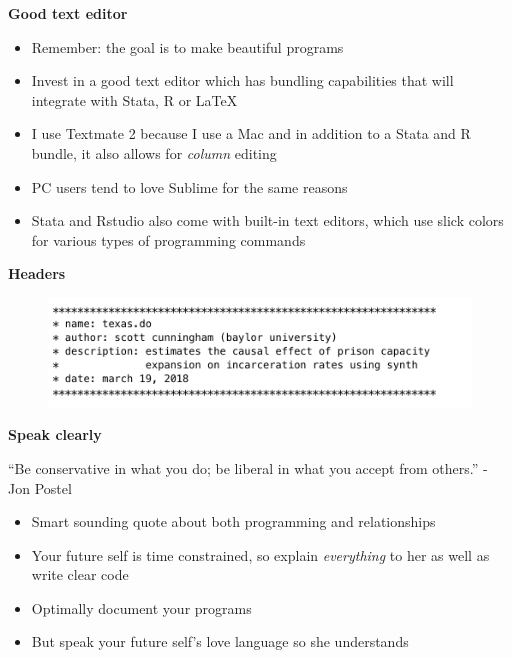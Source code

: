 \documentclass[notes=show]{beamer}
\begin{document}
\begin{frame}[plain]
\begin{center}
\textbf{Good text editor}
\end{center}

\begin{itemize}
\item Remember: the goal is to make beautiful programs
\item Invest in a good text editor which has bundling capabilities that will integrate with Stata, R or LaTeX
\item I use Textmate 2 because I use a Mac and in addition to a Stata and R bundle, it also allows for \emph{column} editing
\item PC users tend to love Sublime for the same reasons
\item Stata and Rstudio also come with built-in text editors, which use slick colors for various types of programming commands
\end{itemize}

\end{frame}

\begin{frame}[plain]
\begin{center}
\textbf{Headers}
\end{center}

\begin{figure}
\includegraphics[scale=0.35]{./lecture_includes/headers.png}
\end{figure}

\end{frame}

\begin{frame}[plain]
\begin{center}
\textbf{Speak clearly}
\end{center}

``Be conservative in what you do; be liberal in what you accept from others.'' - Jon Postel 
\bigskip

\begin{itemize}
\item Smart sounding quote about both programming and relationships
\item Your future self is time constrained, so explain \emph{everything} to her as well as write clear code
\item Optimally document your programs
\item But speak your future self's love language so she understands
\end{itemize}

\end{frame}
\end{document}
